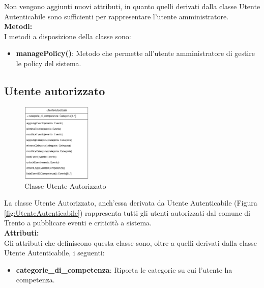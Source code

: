 \documentclass{article}
\begin{document}
Non vengono aggiunti nuovi attributi, in quanto quelli derivati dalla classe Utente Autenticabile sono sufficienti per rappresentare l'utente amministratore.\\

\textbf{Metodi:}\\
I metodi a disposizione della classe sono:

\begin{itemize}
	\item \textbf{managePolicy()}: Metodo che permette all'utente amministratore di gestire le policy del sistema.
\end{itemize}

\subsection{Utente autorizzato}

\begin{figure}[htbp]
	\centering
	\includegraphics[width=0.3\textwidth]{Images/UtenteAutorizzato-Class.png}
	\caption{Classe Utente Autorizzato}
	\label{fig:utente_autorizzato}
\end{figure}

La classe Utente Autorizzato, anch'essa derivata da Utente Autenticabile (Figura \ref{fig:UtenteAutenticabile}) rappresenta tutti gli utenti autorizzati dal comune di Trento a pubblicare eventi e criticità a sistema.\\

\textbf{Attributi:}\\
Gli attributi che definiscono questa classe sono, oltre a quelli derivati dalla classe Utente Autenticabile, i seguenti:
\begin{itemize}
	\item \textbf{categorie\_di\_competenza}: Riporta le categorie su cui l'utente ha competenza.\\
\end{itemize}
\end{document}
